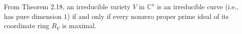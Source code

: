 From Theorem 2.18, an irreducible variety $V$ in $\mathbb{C}^n$ is an irreducible curve (i.e., has pure dimension $1$) if and only if every nonzero proper prime ideal of its coordinate ring $R_V$ is maximal.
